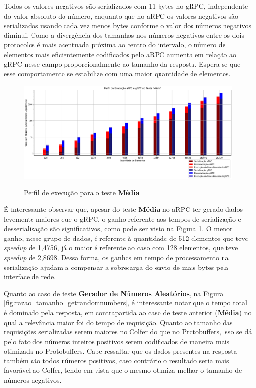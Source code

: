 Todos os valores negativos são serializados com 11 bytes no gRPC, independente do valor absoluto do número, enquanto que no aRPC os valores negativos são serializados usando cada vez menos bytes conforme o valor dos números negativos diminui. Como a divergência dos tamanhos nos números negativos entre os dois protocolos é mais acentuada próxima ao centro do intervalo, o número de elementos mais eficientemente codificados pelo aRPC aumenta em relação ao gRPC nesse campo proporcionalmente ao tamanho da resposta. Espera-se que esse comportamento se estabilize com uma maior quantidade de elementos.

\begin{figure}[ht]
    \centering
    \caption{Perfil de execução para o teste \textbf{Média}}
    \includegraphics[width=\textwidth]{figuras/graficos/serializacao/perfil_execucao_average.png} 
    \label{fig:perfil_execucao_average}
\end{figure}

É interessante observar que, apesar do teste \textbf{Média} no aRPC ter gerado dados levemente maiores que o gRPC, o ganho referente aos tempos de serialização e desserialização são significativos, como pode ser visto na Figura \ref{fig:perfil_execucao_average}. O menor ganho, nesse grupo de dados, é referente à quantidade de 512 elementos que teve \textit{speedup} de 1,4756, já o maior é referente ao caso com 128 elementos, que teve \textit{speedup} de 2,8698. Dessa forma, os ganhos em tempo de processamento na serialização ajudam a compensar a sobrecarga do envio de mais bytes pela interface de rede.


Quanto ao caso de teste \textbf{Gerador de Números Aleatórios}, na Figura \ref{fig:razao_tamanho_getrandomnumbers}, é interessante notar que o tempo total é dominado pela resposta, em contrapartida ao caso de teste anterior (\textbf{Média}) no qual a relevância maior foi do tempo de requisição. Quanto ao tamanho das requisições serializadas serem maiores no Colfer do que no Protobuffers, isso se dá pelo fato dos números inteiros positivos serem codificados de maneira mais otimizada no Protobuffers. Cabe ressaltar que os dados presentes na resposta também são todos números positivos, caso contrário o resultado seria mais favorável ao Colfer, tendo em vista que o mesmo otimiza melhor o tamanho de números negativos.

